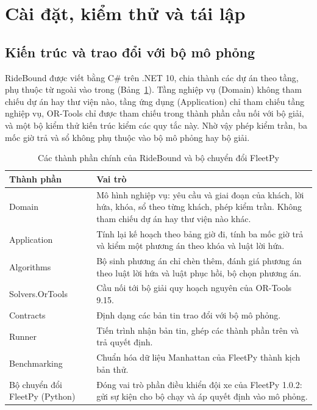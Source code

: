 \section{Cài đặt, kiểm thử và tái lập}
\label{muc:caidat}

\subsection{Kiến trúc và trao đổi với bộ mô phỏng}
\label{muc:kientruc}

RideBound được viết bằng C\# trên .NET 10, chia thành các dự án theo tầng, phụ thuộc từ ngoài vào trong
(Bảng~\ref{bang:kientruc}). Tầng nghiệp vụ (Domain) không tham chiếu dự án hay thư viện nào, tầng ứng dụng
(Application) chỉ tham chiếu tầng nghiệp vụ, OR-Tools chỉ được tham chiếu trong thành phần cầu nối với bộ
giải, và một bộ kiểm thử kiến trúc kiểm các quy tắc này. Nhờ vậy phép kiểm trần, ba mốc giờ trả và sổ
không phụ thuộc vào bộ mô phỏng hay bộ giải.

\begin{table}[htbp]
\centering
\caption{Các thành phần chính của RideBound và bộ chuyển đổi FleetPy}
\label{bang:kientruc}
\small
\begin{tabular}{@{}p{4.0cm}p{10.8cm}@{}}
\toprule
\textbf{Thành phần} & \textbf{Vai trò}\\
\midrule
Domain & Mô hình nghiệp vụ: yêu cầu và giai đoạn của khách, lời hứa, khóa, sổ theo từng khách, phép
kiểm trần. Không tham chiếu dự án hay thư viện nào khác.\\
Application & Tính lại kế hoạch theo bảng giờ đi, tính ba mốc giờ trả và kiểm một phương án theo khóa
và luật lời hứa.\\
Algorithms & Bộ sinh phương án chỉ chèn thêm, đánh giá phương án theo luật lời hứa và luật phục hồi,
bộ chọn phương án.\\
Solvers.OrTools & Cầu nối tới bộ giải quy hoạch nguyên của OR-Tools 9.15.\\
Contracts & Định dạng các bản tin trao đổi với bộ mô phỏng.\\
Runner & Tiến trình nhận bản tin, ghép các thành phần trên và trả quyết định.\\
Benchmarking & Chuẩn hóa dữ liệu Manhattan của FleetPy thành kịch bản thử.\\
Bộ chuyển đổi FleetPy (Python) & Đóng vai trò phần điều khiển đội xe của FleetPy 1.0.2: gửi sự kiện
cho bộ chạy và áp quyết định vào mô phỏng.\\
\bottomrule
\end{tabular}
\end{table}

